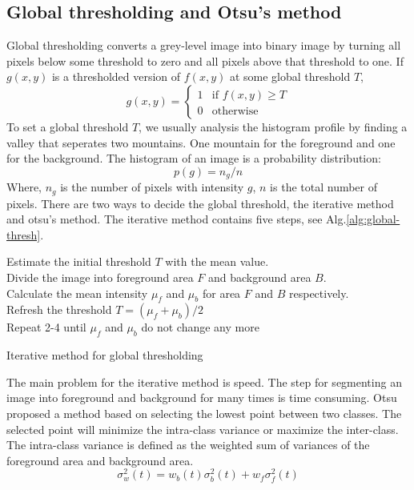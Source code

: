 \documentclass[b5,12pt]{report}
\begin{document}
\subsection{Global thresholding and Otsu's method}
Global thresholding converts a grey-level image into binary image by turning all pixels below some threshold to zero and all pixels above that threshold to one. If $g(x,y)$ is a thresholded version of $f(x,y)$ at some global threshold $T$, 
$$
g(x,y) = \left\{
  \begin{array}{ll}
  1 & \mbox{if } f(x,y) \ge T \\
  0 & \mbox{otherwise}
  \end{array}
  \right.
$$
To set a global threshold $T$, we usually analysis the histogram profile by finding a valley that seperates two mountains. One mountain for the foreground and one for the background. The histogram of an image is a probability distribution:
$$
p(g) = n_g/n
$$
Where, $n_g$ is the number of pixels with intensity $g$, $n$ is the total number of pixels. There are two ways to decide the global threshold, the iterative method and otsu's method. The iterative method contains five steps, see Alg.\ref{alg:global-thresh}.\\
\begin{algorithm}
\SetAlgoLined
{}
Estimate the initial threshold $T$ with the mean value.\\
Divide the image into foreground area $F$ and background area $B$.\\
Calculate the mean intensity $\mu_f$ and $\mu_b$ for area $F$ and $B$ respectively.\\
Refresh the threshold $T = (\mu_f + \mu_b)/2$\\
Repeat 2-4 until $\mu_f$ and $\mu_b$ do not change any more
\caption{Iterative method for global thresholding}
\label{alg:global-thresh}
\end{algorithm}
The main problem for the iterative method is speed. The step for segmenting an image into foreground and background for many times is time consuming. Otsu \cite{otsu1975threshold} proposed a method based on selecting the lowest point between two classes. The selected point will minimize the intra-class variance or maximize the inter-class. The intra-class variance is defined as the weighted sum of variances of the foreground area and background area.
\begin{equation} \label{eq:intra-var}
\sigma_w^2(t) = w_b(t)\sigma_b^2(t) + w_f\sigma_f^2(t)
\end{equation}
\end{document}
